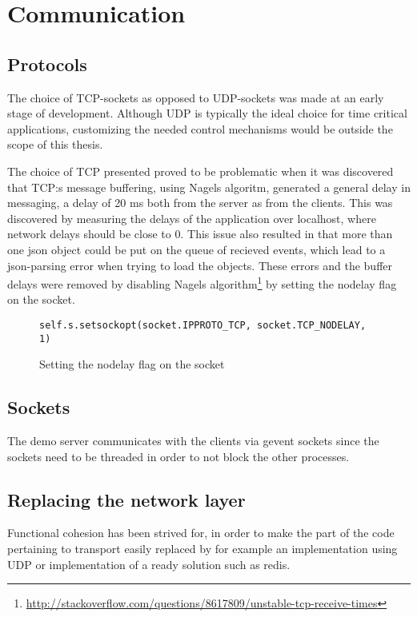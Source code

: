 \section{Communication}

\subsection{Protocols}
The choice of TCP-sockets as opposed to UDP-sockets was made at an early stage of development. Although UDP is typically the ideal choice for time critical applications, customizing the needed control mechanisms would be outside the scope of this thesis. 

The choice of TCP presented proved to be problematic when it was discovered that TCP:s message buffering, using Nagels algoritm, generated a general delay in messaging, a delay of 20 ms both from the server as from the clients. This was discovered by measuring the delays of the application over localhost, where network delays should be close to 0. This issue also resulted in that more than one json object could be put on the queue of recieved events, which lead to a json-parsing error when trying to load the objects. These errors and the buffer delays were removed by disabling Nagels algorithm\footnote{\url{http://stackoverflow.com/questions/8617809/unstable-tcp-receive-times}} by setting the nodelay flag on the socket.


\begin{figure}[h!]
\centering
\texttt{self.s.setsockopt(socket.IPPROTO\_TCP, socket.TCP\_NODELAY, 1)}
\caption{Setting the nodelay flag on the socket}
\end{figure}

\subsection{Sockets}
The demo server communicates with the clients via gevent sockets since the sockets need to be threaded in order to not block the other processes. 


\subsection{Replacing the network layer}
Functional cohesion has been strived for, in order to make the part of the code pertaining to transport easily replaced by for example an implementation using UDP or implementation of a ready solution such as redis. 




